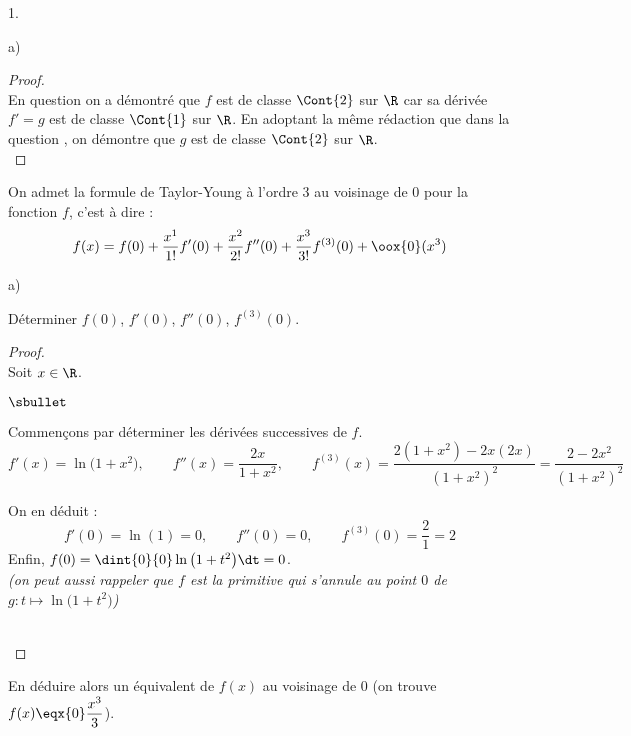 \documentclass[11pt]{article}%
\begin{document}
\begin{noliste}{1.}
\begin{noliste}{a)}
    \begin{proof}~\\%
      En question  on a démontré que $f$ est de classe
      $\Cont{2}$ sur $\R$ car sa dérivée $f' = g$ est de classe
      $\Cont{1}$ sur $\R$. En adoptant la même rédaction que dans la
      question , on démontre que $g$ est de classe
      $\Cont{2}$ sur $\R$.%
      ~\\[-1.2cm] 
    \end{proof}
  \end{noliste}
  On admet la formule de Taylor-Young à l'ordre $3$ au voisinage de
  $0$ pour la fonction $f$, c'est à dire :
  \[
  f(x) = f(0) + \dfrac{x^1}{1!} f'(0) + \dfrac{x^2}{2!} f''(0) +
  \dfrac{x^3}{3!} f^{(3)}(0) + \oox{0} (x^3)
  \]
  \begin{noliste}{a)}
    \setcounter{enumii}{1} %
    \setlength{\itemsep}{2mm}
  \item Déterminer $f(0)$, $f'(0)$, $f''(0)$, $f^{(3)}(0)$.

    \begin{proof}~\\%
      Soit $x \in \R$.
      \begin{noliste}{$\sbullet$}
      \item Commençons par déterminer les dérivées successives de $f$.
        \[
        f'(x) = \ln\big( 1+x^2 \big), \qquad f''(x) =
        \dfrac{2x}{1+x^2}, \qquad f^{(3)}(x) = \dfrac{2(1+x^2) -
          2x(2x)}{(1+x^2)^2} = \dfrac{2 - 2x^2}{(1+x^2)^2}
        \]

      \item On en déduit : 
        \[
        f'(0) = \ln(1) = 0, \qquad f''(0) = 0, \qquad f^{(3)}(0) =
        \dfrac{2}{1} = 2
        \]
        Enfin, $f(0) = \dint{0}{0} \ln\big( 1+t^2 \big) \dt = 0$.\\%
        {\it (on peut aussi rappeler que $f$ est la primitive qui
          s'annule au point $0$ de $g : t \mapsto \ln\big( 1+t^2
          \big)$)}
      \end{noliste}
      ~\\[-1.4cm]
    \end{proof}

  \item En déduire alors un équivalent de $f(x)$ au voisinage de $0$
    (on trouve $f(x) \eqx{0} \dfrac{x^3}{3}$).


\end{noliste}
\end{noliste}
\end{document}
